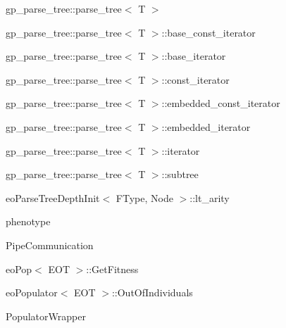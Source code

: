 \begin{CompactList}
\item gp\_\-parse\_\-tree::parse\_\-tree$<$ T $>$\item gp\_\-parse\_\-tree::parse\_\-tree$<$ T $>$::base\_\-const\_\-iterator\item gp\_\-parse\_\-tree::parse\_\-tree$<$ T $>$::base\_\-iterator\item gp\_\-parse\_\-tree::parse\_\-tree$<$ T $>$::const\_\-iterator\item gp\_\-parse\_\-tree::parse\_\-tree$<$ T $>$::embedded\_\-const\_\-iterator\item gp\_\-parse\_\-tree::parse\_\-tree$<$ T $>$::embedded\_\-iterator\item gp\_\-parse\_\-tree::parse\_\-tree$<$ T $>$::iterator\item gp\_\-parse\_\-tree::parse\_\-tree$<$ T $>$::subtree\item eo\-Parse\-Tree\-Depth\-Init$<$ FType, Node $>$::lt\_\-arity\item {}
\item {}
\item phenotype\item Pipe\-Communication\item {}
\item eo\-Pop$<$ EOT $>$::Get\-Fitness\item {}
\item {}
\begin{CompactList}
\item {}
\item {}
\end{CompactList}
\item eo\-Populator$<$ EOT $>$::Out\-Of\-Individuals\item {}
\begin{CompactList}
\item Populator\-Wrapper\end{CompactList}

\end{CompactList}
